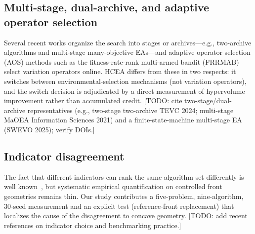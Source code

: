 \documentclass[journal]{IEEEtran}
\begin{document}
\subsection{Multi-stage, dual-archive, and adaptive operator selection}
Several recent works organize the search into stages or archives---e.g., two-archive algorithms and multi-stage many-objective EAs---and adaptive operator selection (AOS) methods such as the fitness-rate-rank multi-armed bandit (FRRMAB)~\cite{li2014frrmab} select variation operators online. HCEA differs from these in two respects: it switches between environmental-selection mechanisms (not variation operators), and the switch decision is adjudicated by a direct measurement of hypervolume improvement rather than accumulated credit. [TODO: cite two-stage/dual-archive representatives (e.g., two-stage two-archive TEVC 2024; multi-stage MaOEA Information Sciences 2021) and a finite-state-machine multi-stage EA (SWEVO 2025); verify DOIs.]

\subsection{Indicator disagreement}
The fact that different indicators can rank the same algorithm set differently is well known~\cite{zitzler2003performance}, but systematic empirical quantification on controlled front geometries remains thin. Our study contributes a five-problem, nine-algorithm, 30-seed measurement and an explicit test (reference-front replacement) that localizes the cause of the disagreement to concave geometry. [TODO: add recent references on indicator choice and benchmarking practice.]
\end{document}
